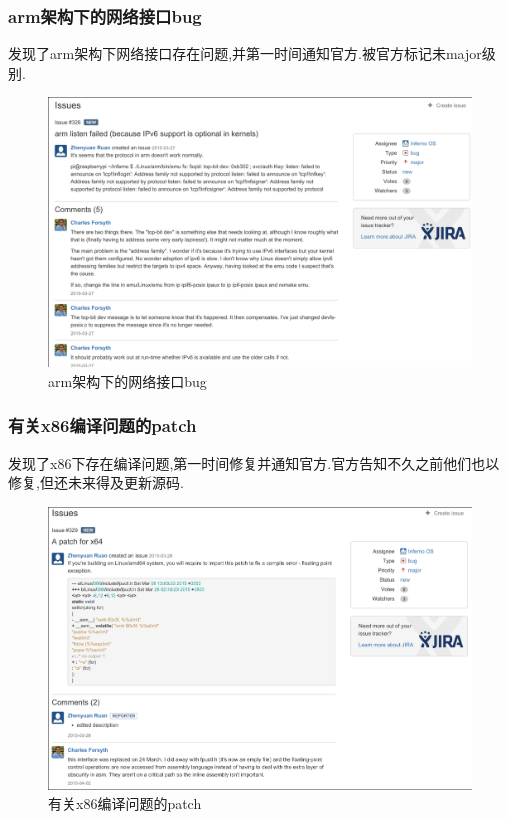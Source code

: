 \documentclass[paper=a4]{ctexart} %
\numberwithin{equation}{section} %
\numberwithin{figure}{section} %
\numberwithin{table}{section} %
\begin{document}
\subsubsection{arm架构下的网络接口bug}
发现了arm架构下网络接口存在问题,并第一时间通知官方.被官方标记未major级别.

    \begin{figure}[htbp]
      \centering
      \includegraphics[width=1\textwidth]{pic/bug2.png}
      \caption{arm架构下的网络接口bug}
    \end{figure}

\subsubsection{有关x86编译问题的patch}
发现了x86下存在编译问题,第一时间修复并通知官方.官方告知不久之前他们也以修复,但还未来得及更新源码.

    \begin{figure}[htbp]
      \centering
      \includegraphics[width=1\textwidth]{pic/patch.png}
      \caption{有关x86编译问题的patch}
    \end{figure}
\end{document}
